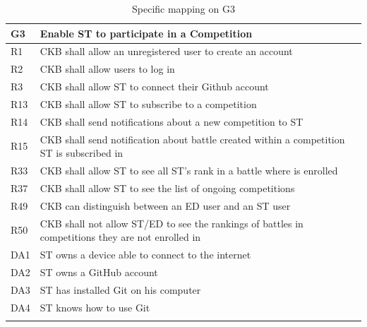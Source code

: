   \pagebreak 


  \begin{longtable}{|l|p{12cm}| }
    \hline
    \textbf{G3} & \textbf{Enable ST to participate in a Competition}      \\
    \hline
    R1 & CKB shall allow an unregistered user to create an account \\
    \hline
    R2 & CKB shall allow users to log in \\
    \hline
    R3 & CKB shall allow ST to connect their Github account \\
    \hline
    R13 & CKB shall allow ST to subscribe to a competition \\
    \hline
    R14 & CKB shall send notifications about a new competition to ST \\
    \hline
    R15 & CKB shall send notification about battle created within a competition ST is subscribed in \\
    \hline
    R33 & CKB shall allow ST to see all ST’s rank in a battle where is enrolled \\
    \hline
    R37 & CKB shall allow ST to see the list of ongoing competitions \\
    \hline
    R49 & CKB can distinguish between an ED user and an ST user \\
    \hline
    R50 & CKB shall not allow ST/ED to see the rankings of battles in competitions they are not enrolled in \\
    \hline
    DA1 & ST owns a device able to connect to the internet \\
    \hline
    DA2 & ST owns a GitHub account \\
    \hline
    DA3 & ST has installed Git on his computer \\
    \hline
    DA4 & ST knows how to use Git \\
    \hline

    \caption{Specific mapping on G3}
    \label{tab:mappingG3}
  \end{longtable}

